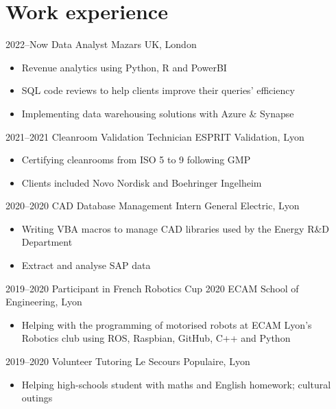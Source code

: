 
\section{Work experience}

\begin{entrylist}


\entry
{2022--Now}
{Data Analyst}
{Mazars UK, London}
{\begin{itemize}
\item Revenue analytics using Python, R and PowerBI
\item SQL code reviews to help clients improve their queries’ efficiency
\item Implementing data warehousing solutions with Azure \& Synapse
\end{itemize}}


\entry
{2021--2021}
{Cleanroom Validation Technician}
{ESPRIT Validation, Lyon}
{\begin{itemize}
\item Certifying cleanrooms from ISO 5 to 9 following GMP
\item Clients included Novo Nordisk and Boehringer Ingelheim
\end{itemize}}


\entry
{2020--2020}
{CAD Database Management Intern}
{General Electric, Lyon}
{\begin{itemize}
\item Writing VBA macros to manage CAD libraries used by the Energy R\&D Department
\item Extract and analyse SAP data \end{itemize}}


\entry
{2019--2020}
{Participant in French Robotics Cup 2020}
{ECAM School of Engineering, Lyon}
{\begin{itemize}
\item Helping with the programming of motorised robots at ECAM Lyon's Robotics club using ROS, Raspbian, GitHub, C++ and Python
\end{itemize}}


\entry
{2019--2020}
{Volunteer Tutoring}
{Le Secours Populaire, Lyon}
{\begin{itemize}
\item Helping high-schools student with maths and English homework; cultural outings
\end{itemize}}

\end{entrylist}
